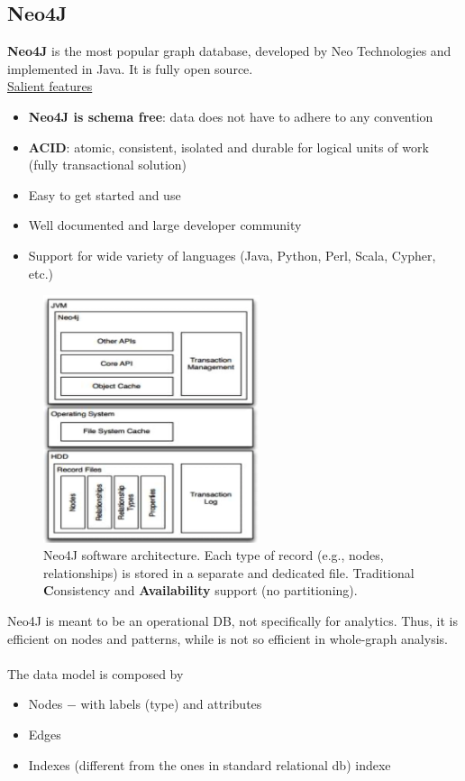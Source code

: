 \documentclass[10pt,a4paper]{article}
\newcommand{\nline}{\\~\\}
\begin{document}
\subsection{Neo4J}
\textbf{Neo4J} is the most popular graph database, developed by Neo Technologies and implemented in Java. It is fully open source. \\
\uline{Salient features}
\begin{itemize}
	\item \textbf{Neo4J is schema free}: data does not have to adhere to any convention
	\item \textbf{ACID}: atomic, consistent, isolated and durable for logical units of work (fully transactional solution)
	\item Easy to get started and use
	\item Well documented and large developer community
	\item Support for wide variety of languages (Java, Python, Perl, Scala, Cypher, etc.)
\end{itemize}
\begin{figure}[h!]
 \hfill \includegraphics[width=180pt]{images/neo4j-arch.png}\hspace*{\fill}
  \caption{Neo4J software architecture. Each type of record (e.g., nodes, relationships) is stored in a separate and dedicated file. Traditional \textbf{C}onsistency and \textbf{Availability} support (no partitioning).}
\end{figure} 
Neo4J is meant to be an operational DB, not specifically for analytics. Thus, it is efficient on nodes and patterns, while is not so efficient in whole-graph analysis. \nline
The data model is composed by 
\begin{itemize}
	\item Nodes $-$ with labels (type) and attributes
	\item Edges
	\item Indexes (different from the ones in standard relational db) indexe
\end{itemize}
\end{document}
